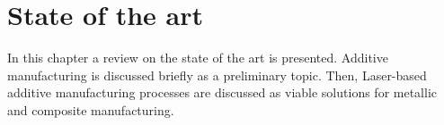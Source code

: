 %
\chapter{State of the art}
\label{ch:state-art}
In this chapter a review on the state of the art is presented. %
Additive manufacturing is discussed briefly as a preliminary topic. %
Then, Laser-based additive manufacturing processes are discussed as viable
solutions for metallic and composite manufacturing. %


